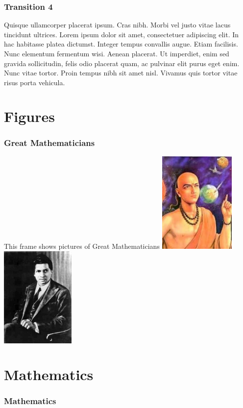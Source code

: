\documentclass{beamer}
\begin{document}
\begin{frame}
\frametitle{Transition 4}
\transboxin
Quisque ullamcorper placerat ipsum. Cras nibh. Morbi vel justo
vitae lacus tincidunt ultrices. Lorem ipsum dolor sit amet,
consectetuer adipiscing elit. In hac habitasse platea dictumst.
Integer tempus convallis augue. Etiam facilisis. Nunc elementum
fermentum wisi. Aenean placerat. Ut imperdiet, enim sed gravida
sollicitudin, felis odio placerat quam, ac pulvinar elit purus eget
enim. Nunc vitae tortor. Proin tempus nibh sit amet nisl. Vivamus
quis tortor vitae risus porta vehicula.

\end{frame}

\section{Figures}
\begin{frame}
\frametitle{Great Mathematicians}
This frame shows pictures of Great Mathematicians
\includegraphics[height=5cm]{aryabhatta.jpeg}
\includegraphics[height=5cm]{Srinivasa.jpg}
\end{frame}

\section{Mathematics}
\begin{frame}
\frametitle{Mathematics}



\end{frame}
\end{document}
